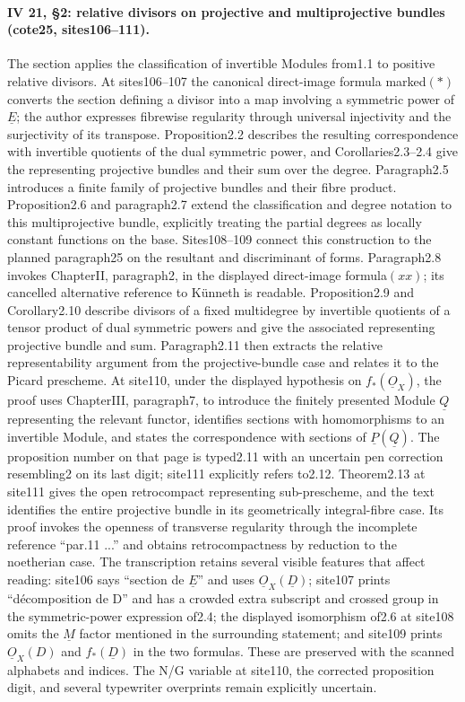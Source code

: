 \paragraph{IV 21, \S2: relative divisors on projective and multiprojective bundles (cote25, sites106--111).}
The section applies the classification of invertible Modules from1.1 to positive relative divisors. At sites106--107 the canonical direct-image formula marked$(*)$ converts the section defining a divisor into a map involving a symmetric power of $\underline E$; the author expresses fibrewise regularity through universal injectivity and the surjectivity of its transpose. Proposition2.2 describes the resulting correspondence with invertible quotients of the dual symmetric power, and Corollaries2.3--2.4 give the representing projective bundles and their sum over the degree. Paragraph2.5 introduces a finite family of projective bundles and their fibre product. Proposition2.6 and paragraph2.7 extend the classification and degree notation to this multiprojective bundle, explicitly treating the partial degrees as locally constant functions on the base. Sites108--109 connect this construction to the planned paragraph25 on the resultant and discriminant of forms. Paragraph2.8 invokes ChapterII, paragraph2, in the displayed direct-image formula$(xx)$; its cancelled alternative reference to Künneth is readable. Proposition2.9 and Corollary2.10 describe divisors of a fixed multidegree by invertible quotients of a tensor product of dual symmetric powers and give the associated representing projective bundle and sum. Paragraph2.11 then extracts the relative representability argument from the projective-bundle case and relates it to the Picard prescheme. At site110, under the displayed hypothesis on $f_*(\underline O_X)$, the proof uses ChapterIII, paragraph7, to introduce the finitely presented Module $\underline Q$ representing the relevant functor, identifies sections with homomorphisms to an invertible Module, and states the correspondence with sections of $\underline P(\underline Q)$. The proposition number on that page is typed2.11 with an uncertain pen correction resembling2 on its last digit; site111 explicitly refers to2.12. Theorem2.13 at site111 gives the open retrocompact representing sub-prescheme, and the text identifies the entire projective bundle in its geometrically integral-fibre case. Its proof invokes the openness of transverse regularity through the incomplete reference ``par.11 ...'' and obtains retrocompactness by reduction to the noetherian case. The transcription retains several visible features that affect reading: site106 says ``section de $\underline E$'' and uses $\underline O_X(\underline D)$; site107 prints ``décomposition de D'' and has a crowded extra subscript and crossed group in the symmetric-power expression of2.4; the displayed isomorphism of2.6 at site108 omits the $\underline M$ factor mentioned in the surrounding statement; and site109 prints $\underline O_X(D)$ and $f_*(\underline D)$ in the two formulas. These are preserved with the scanned alphabets and indices. The N/G variable at site110, the corrected proposition digit, and several typewriter overprints remain explicitly uncertain.
